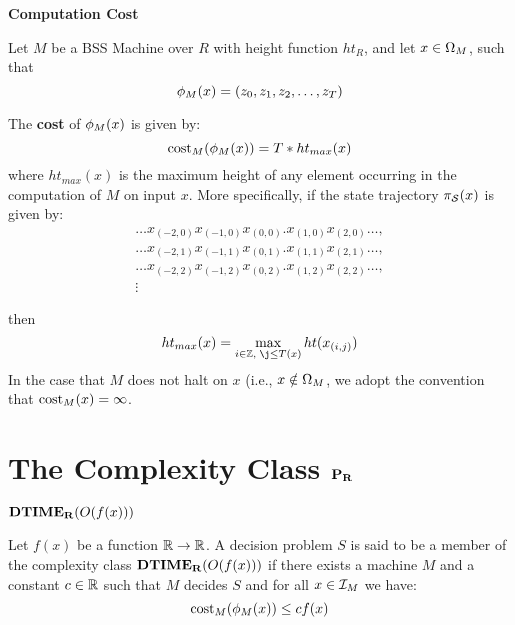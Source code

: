 \begin{definition}{\textbf{Computation Cost}}
  
  Let $M$ be a BSS Machine over $R$ with height function $ht_R$, and
  let $x \in \Omega_M$, such that 
  $$\phi_M(x) = (z_0, z_1,z_2, \ldots, z_T)$$ 
  
  The \textbf{cost} of $\phi_M(x)$ is given by:
  $$\text{cost}_M(\phi_M(x)) = T*ht_{max}(x)$$
  where $ht_{max}(x)$ is the maximum height of any element occurring
  in the computation of $M$ on input $x$.  More specifically, if the
  state trajectory $\pi_{\mathcal{S}}(x)$ is given by: 
  \begin{eqnarray*}
    \ldots x_{(-2,0)}x_{(-1,0)}x_{(0,0)}.x_{(1,0)}x_{(2,0)} \ldots ,\\ 
    \ldots x_{(-2,1)}x_{(-1,1)}x_{(0,1)}.x_{(1,1)}x_{(2,1)} \ldots ,\\ 
    \ldots x_{(-2,2)}x_{(-1,2)}x_{(0,2)}.x_{(1,2)}x_{(2,2)} \ldots ,\\
    \vdots       
  \end{eqnarray*}

  then $$ht_{max}(x) = \max_{i \in \integers, \; \j \leq T(x)}ht(x_{(i,j)})$$
  In the case that $M$ does not halt on $x$ (i.e., $x \notin
  \Omega_M$, we adopt the convention that $\text{cost}_M(x) = \infty$.
\end{definition}


\section{The Complexity Class $\mathbf{P_R}$}

\begin{definition}\textbf{$\mathbf{DTIME_R}(O(f(x)))$}

  Let $f(x)$ be a function $\mathbb{R} \rightarrow \mathbb{R}$.  A decision
  problem $S$ is said to be a member of the complexity class
  $\mathbf{DTIME_R}(O(f(x)))$ if there exists a machine $M$ and a constant $c
  \in \mathbb{R}$ such that $M$ decides $S$ and for all $x \in \mathcal{I}_M$
  we have:
  $$\text{cost}_M(\phi_M(x)) \leq cf(x)$$
\end{definition}

